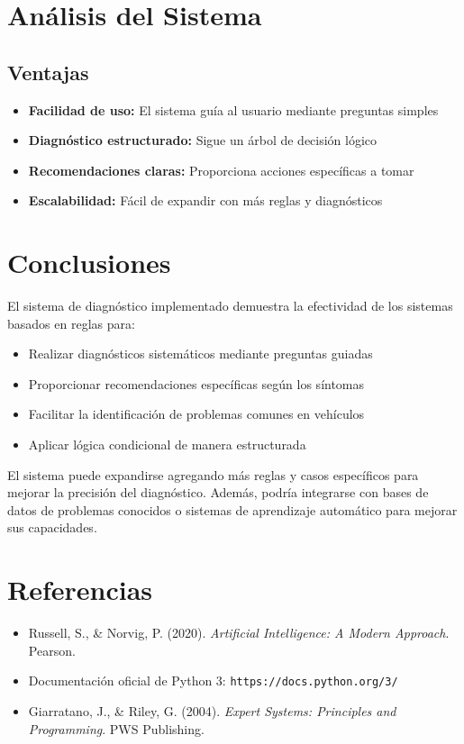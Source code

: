 \documentclass[12pt]{article}
\begin{document}
\section{Análisis del Sistema}

\subsection{Ventajas}
\begin{itemize}
    \item \textbf{Facilidad de uso:} El sistema guía al usuario mediante preguntas simples
    \item \textbf{Diagnóstico estructurado:} Sigue un árbol de decisión lógico
    \item \textbf{Recomendaciones claras:} Proporciona acciones específicas a tomar
    \item \textbf{Escalabilidad:} Fácil de expandir con más reglas y diagnósticos
\end{itemize}


\section{Conclusiones}

El sistema de diagnóstico implementado demuestra la efectividad de los sistemas basados en reglas para:

\begin{itemize}
    \item Realizar diagnósticos sistemáticos mediante preguntas guiadas
    \item Proporcionar recomendaciones específicas según los síntomas
    \item Facilitar la identificación de problemas comunes en vehículos
    \item Aplicar lógica condicional de manera estructurada
\end{itemize}

El sistema puede expandirse agregando más reglas y casos específicos para mejorar la precisión del diagnóstico. Además, podría integrarse con bases de datos de problemas conocidos o sistemas de aprendizaje automático para mejorar sus capacidades.


\section{Referencias}

\begin{itemize}
    \item Russell, S., \& Norvig, P. (2020). \textit{Artificial Intelligence: A Modern Approach}. Pearson.
    \item Documentación oficial de Python 3: \texttt{https://docs.python.org/3/}
    \item Giarratano, J., \& Riley, G. (2004). \textit{Expert Systems: Principles and Programming}. PWS Publishing.
\end{itemize}
\end{document}
